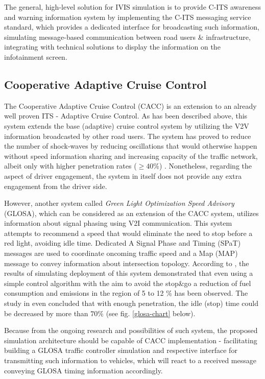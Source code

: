 \documentclass[main.tex]{subfiles}
\begin{document}
The general, high-level solution for IVIS simulation is to provide C-ITS awareness and warning information system by 
implementing the C-ITS messaging service standard, which provides a dedicated interface for broadcasting such information,
simulating message-based communication between road users \& infrastructure, integrating with
technical solutions to display the information on the infotainment screen.

\subsection{Cooperative Adaptive Cruise Control}

The Cooperative Adaptive Cruise Control (CACC) is an extension to an already well proven ITS -
Adaptive Cruise Control.  As has been described above, this system extends the base (adaptive)
cruise control system by utilizing the V2V information broadcasted by other road users. The
system has proved to reduce the number of shock-waves by reducing oscillations that would
otherwise happen without speed information sharing and increasing capacity of the traffic
network, albeit only with higher penetration rates ($\ge 40\%$) \cite{van_Arem_2006}. Nonetheless,
regarding the aspect of driver engagement, the system in itself does not provide any
extra engagement from the driver side. 

However, another system called \emph{Green Light Optimization Speed Advisory} (GLOSA), which
can be considered as an extension of the CACC system, utilizes information about signal phasing
using V2I communication. This system attempts to recommend a speed that would eliminate the
need to stop before a red light, avoiding idle time. Dedicated A Signal Phase and Timing (SPaT)
messages are used to coordinate oncoming traffic speed and a Map (MAP) message to convey
information about intersection topology. According to \cite{Pariota_2019}, the results of
simulating deployment of this system demonstrated that even using a simple control algorithm
with the aim to avoid the stop\&go a reduction of fuel consumption and emissions in the region
of 5 to 12 \% has been observed. The study in \cite{Katsaros_2011} even concluded that with
enough penetration, the idle (stop) time could be decreased by more than $70 \%$ (see fig.
\ref{glosa-chart} below).

Because from the ongoing research and possibilities of such system, the proposed simulation architecture 
should be capable of CACC implementation - facilitating building a GLOSA traffic controller simulation
and respective interface for transmitting such information to vehicles, which will react to a received 
message conveying GLOSA timing information accordingly. 
\end{document}
